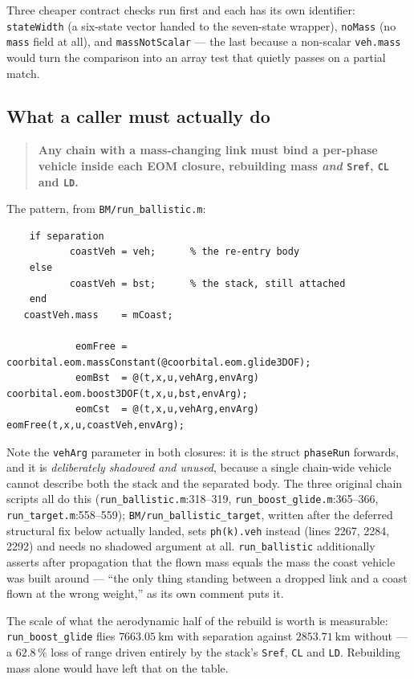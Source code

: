 \documentclass[11pt]{article}
\newcommand{\code}[1]{\texttt{#1}}
\begin{document}
Three cheaper contract checks run first and each has its own identifier:
\code{stateWidth} (a six-state vector handed to the seven-state wrapper),
\code{noMass} (no \code{mass} field at all), and \code{massNotScalar} --- the
last because a non-scalar \code{veh.mass} would turn the comparison into an
array test that quietly passes on a partial match.

\subsection{What a caller must actually do}

\begin{quote}
\textbf{Any chain with a mass-changing link must bind a per-phase vehicle
inside each EOM closure, rebuilding mass \emph{and} \code{Sref}, \code{CL} and
\code{LD}.}
\end{quote}

The pattern, from \code{BM/run\_ballistic.m}:

\begin{lstlisting}
    if separation
           coastVeh = veh;      % the re-entry body
    else
           coastVeh = bst;      % the stack, still attached
    end
   coastVeh.mass    = mCoast;

            eomFree = coorbital.eom.massConstant(@coorbital.eom.glide3DOF);
            eomBst  = @(t,x,u,vehArg,envArg) coorbital.eom.boost3DOF(t,x,u,bst,envArg);
            eomCst  = @(t,x,u,vehArg,envArg) eomFree(t,x,u,coastVeh,envArg);
\end{lstlisting}

Note the \code{vehArg} parameter in both closures: it is the struct
\code{phaseRun} forwards, and it is \emph{deliberately shadowed and unused},
because a single chain-wide vehicle cannot describe both the stack and the
separated body. The three original chain scripts all do this
(\code{run\_ballistic.m}:318--319, \code{run\_boost\_glide.m}:365--366,
\code{run\_target.m}:558--559); \code{BM/run\_ballistic\_target}, written after
the deferred structural fix below actually landed, sets \code{ph(k).veh}
instead (lines 2267, 2284, 2292) and needs no shadowed argument at all.
\code{run\_ballistic} additionally asserts
after propagation that the flown mass equals the mass the coast vehicle was
built around --- ``the only thing standing between a dropped link and a coast
flown at the wrong weight,'' as its own comment puts it.

The scale of what the aerodynamic half of the rebuild is worth is measurable:
\code{run\_boost\_glide} flies $7663.05~\mathrm{km}$ with separation against
$2853.71~\mathrm{km}$ without --- a $62.8\,\%$ loss of range driven entirely by
the stack's \code{Sref}, \code{CL} and \code{LD}. Rebuilding mass alone would
have left that on the table.
\end{document}
